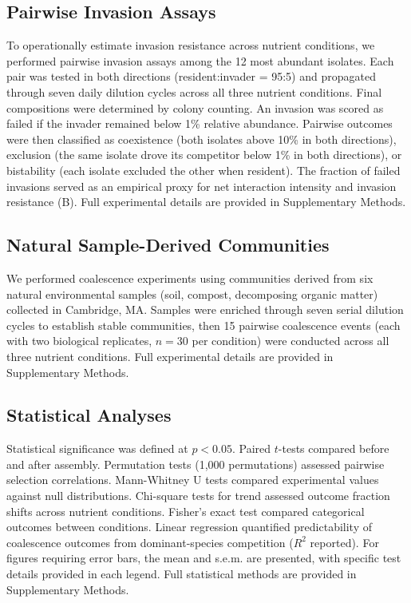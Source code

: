 \subsection*{Pairwise Invasion Assays}
\label{sec:methods:invasion}

To operationally estimate invasion resistance across nutrient conditions, we performed pairwise invasion assays among the 12 most abundant isolates. Each pair was tested in both directions (resident:invader = 95:5) and propagated through seven daily dilution cycles across all three nutrient conditions. Final compositions were determined by colony counting. An invasion was scored as failed if the invader remained below 1\% relative abundance. Pairwise outcomes were then classified as coexistence (both isolates above 10\% in both directions), exclusion (the same isolate drove its competitor below 1\% in both directions), or bistability (each isolate excluded the other when resident). The fraction of failed invasions served as an empirical proxy for net interaction intensity and invasion resistance (B). Full experimental details are provided in Supplementary Methods.



\subsection*{Natural Sample-Derived Communities}
\label{sec:methods:natural}

We performed coalescence experiments using communities derived from six natural environmental samples (soil, compost, decomposing organic matter) collected in Cambridge, MA.  Samples were enriched through seven serial dilution cycles to establish stable communities, then 15 pairwise coalescence events (each with two biological replicates, $n = 30$ per condition) were conducted across all three nutrient conditions. Full experimental details are provided in Supplementary Methods.


\subsection*{Statistical Analyses}
\label{sec:methods:statistics}

Statistical significance was defined at $p < 0.05$. Paired $t$-tests compared  before and after assembly. Permutation tests (1,000 permutations) assessed pairwise selection correlations. Mann-Whitney U tests compared experimental values against null distributions. Chi-square tests for trend assessed outcome fraction shifts across nutrient conditions. Fisher's exact test compared categorical outcomes between conditions. Linear regression quantified predictability of coalescence outcomes from dominant-species competition ($R^2$ reported). For figures requiring error bars, the mean and s.e.m. are presented, with specific test details provided in each legend. Full statistical methods are provided in Supplementary Methods.


